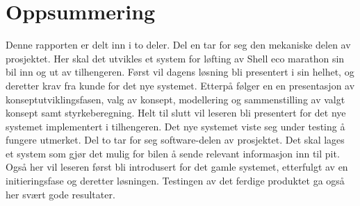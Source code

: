 \section{\center Oppsummering}
Denne rapporten er delt inn i to deler.\newline
Del en tar for seg den mekaniske delen av prosjektet. Her skal det utvikles et system for løfting av Shell eco marathon sin bil inn og ut av tilhengeren. Først vil dagens løsning bli presentert i sin helhet, og deretter krav fra kunde for det nye systemet. Etterpå følger en en presentasjon av konseptutviklingsfasen, valg av konsept, modellering og sammenstilling av valgt konsept samt styrkeberegning. Helt til slutt vil leseren bli presentert for det nye systemet implementert i tilhengeren. Det nye systemet viste seg under testing å fungere utmerket.
Del to tar for seg software-delen av prosjektet. Det skal lages et system som gjør det mulig for bilen å sende relevant informasjon inn til pit. Også her vil leseren først bli introdusert for det gamle systemet, etterfulgt av en initieringsfase og deretter løsningen. Testingen av det ferdige produktet ga også her svært gode resultater.